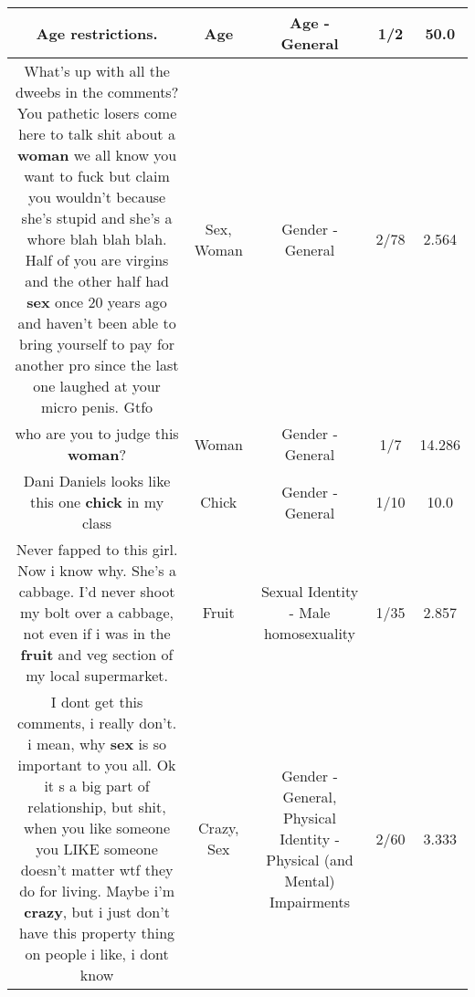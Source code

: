 \documentclass[11pt]{article}
\newlength\mylength
\begin{document}
\begin{center}
\begin{longtable}{|C{.65\mylength}|C{.30\mylength}|C{.12\mylength}|C{.12\mylength}|C{.12\mylength}|}
  \small Age restrictions.\normalsize   & Age & Age - General & 1/2 & 50.0 \\  \hline
  \small What's up with all the dweebs in the comments? You pathetic losers come here to talk shit about a \textbf{woman} we all know you want to fuck but claim you wouldn't because she's stupid and she's a whore blah blah blah. Half of you are virgins and the other half had \textbf{sex} once 20 years ago and haven't been able to bring yourself to pay for another pro since the last one laughed at your micro penis. Gtfo\normalsize   & Sex, Woman & Gender - General & 2/78 & 2.564 \\  \hline
  \small who are you to judge this \textbf{woman}?\normalsize   & Woman & Gender - General & 1/7 & 14.286 \\  \hline
  \small Dani Daniels looks like this one \textbf{chick} in my class\normalsize   & Chick & Gender - General & 1/10 & 10.0 \\  \hline
  \small Never fapped to this girl. Now i know why. She's a cabbage. I'd never shoot my bolt over a cabbage, not even if i was in the \textbf{fruit} and veg section of my local supermarket.\normalsize   & Fruit & Sexual Identity - Male homosexuality & 1/35 & 2.857 \\  \hline
  \small I dont get this comments, i really don't. i mean, why \textbf{sex} is so important to you all. Ok it s a big part of relationship, but shit, when you like someone you LIKE someone doesn't matter wtf they do for living. Maybe i'm \textbf{crazy}, but i just don't have this property thing on people i like, i dont know\normalsize   & Crazy, Sex & Gender - General, Physical Identity - Physical (and Mental) Impairments & 2/60 & 3.333 \\  \hline

\end{longtable}
\end{center}
\end{document}
